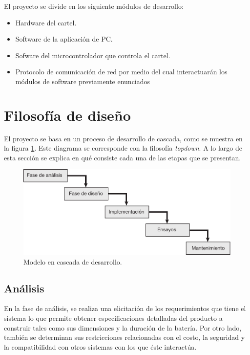 El proyecto se divide en los siguiente módulos de desarrollo:

\begin{itemize}
	\item Hardware del cartel.
	\item Software de la aplicación de PC.
	\item Sofware del microcontrolador que controla el cartel.
	\item Protocolo de comunicación de red por medio del cual interactuarán los módulos de software previamente enunciados
\end{itemize}


\section{Filosofía de diseño} \label{sec:filosofia}
El proyecto se basa en un proceso de desarrollo de cascada, como se muestra en la figura \ref{fig:waterfall}. Este diagrama se corresponde con la filosofía \emph{topdown}. A lo largo de esta sección se explica en qué consiste cada una de las etapas que se presentan.

\begin{figure}[!ht]
	\centering
	\includegraphics[width=1\linewidth]{imagenes/waterfall.pdf}
	\caption{Modelo en cascada de desarrollo.}
	\label{fig:waterfall}
\end{figure}


\subsection{Análisis}
En la fase de análisis, se realiza una elicitación de los requerimientos que tiene el sistema lo que permite obtener especificaciones detalladas del producto a construir tales como sus dimensiones y la duración de la batería. Por otro lado, también se determinan sus restricciones relacionadas con el costo, la seguridad y la compatibilidad con otros sistemas con los que éste interactúa.

